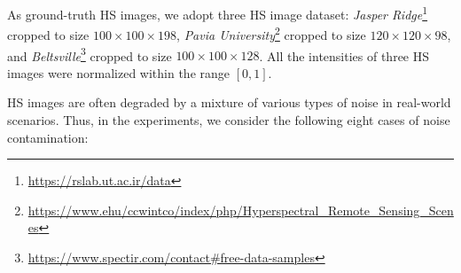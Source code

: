 As ground-truth HS images, we adopt three HS image dataset: \textit{Jasper Ridge}\footnote{\url{https://rslab.ut.ac.ir/data}} cropped to size $100 \times 100 \times 198$, \textit{Pavia University}\footnote{\url{https://www.ehu/ccwintco/index/php/Hyperspectral_Remote_Sensing_Scenes}} cropped to size $120 \times 120 \times 98$, and \textit{Beltsville}\footnote{\url{https://www.spectir.com/contact#free-data-samples}} cropped to size $100 \times 100 \times 128$.
All the intensities of three HS images were normalized within the range $[0, 1]$.

HS images are often degraded by a mixture of various types of noise in real-world scenarios.
Thus, in the experiments, we consider the following eight cases of noise contamination:
